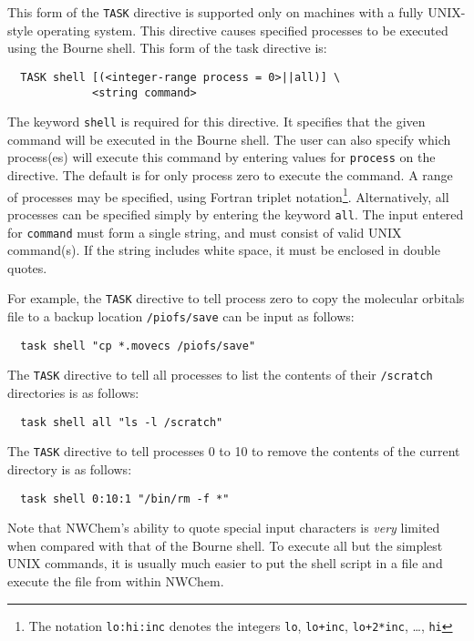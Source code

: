 This form of the \verb+TASK+ directive is supported only on machines
with a fully UNIX-style operating system.  This directive causes
specified processes to be executed using the Bourne shell.  This form
of the task directive is:

\begin{verbatim}
  TASK shell [(<integer-range process = 0>||all)] \
             <string command> 
\end{verbatim}

The keyword \verb+shell+ is required for this directive.  It specifies
that the given command will be executed in the Bourne shell.  The user
can also specify which process(es) will execute this command by
entering values for \verb+process+ on the directive.  The default is
for only process zero to execute the command.  A range of processes
may be specified, using Fortran triplet notation\footnote{The notation
{\tt lo:hi:inc} denotes the integers {\tt lo}, {\tt lo+inc},
{\tt lo+2*inc}, \ldots, {\tt hi}}.  Alternatively, all
processes can be specified simply by entering the keyword \verb+all+.
The input entered for \verb+command+ must form a single string, and
must consist of valid UNIX command(s).  If the string includes white space,
it must be enclosed in double quotes.

For example, the \verb+TASK+ directive to tell process zero to copy the 
molecular orbitals file to a backup location \verb+/piofs/save+ can be input as follows:

\begin{verbatim}
  task shell "cp *.movecs /piofs/save"
\end{verbatim}

The \verb+TASK+ directive to tell all processes to list the contents of 
their \verb+/scratch+ directories is as follows:

\begin{verbatim}
  task shell all "ls -l /scratch"
\end{verbatim}

The \verb+TASK+ directive to tell processes 0 to 10 to remove the 
contents of the current directory is as follows:

\begin{verbatim}
  task shell 0:10:1 "/bin/rm -f *"
\end{verbatim}

Note that NWChem's ability to quote special input characters is {\em
  very} limited when compared with that of the Bourne shell.  To
execute all but the simplest UNIX commands, it is usually much easier
to put the shell script in a file and execute the file from within
NWChem.

